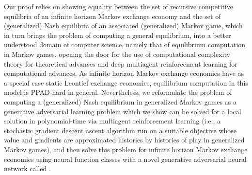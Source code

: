 Our proof relies on showing equality between the set of recursive competitive equilibria of an infinite horizon Markov exchange economy and the set of (generalized) Nash equilibria of an associated (generalized) Markov game, which in turn brings the problem of computing a general equilibrium, into a better understood domain of computer science, namely that of equilibrium computation in Markov games, opening the door for the use of computational complexity theory for theoretical advances and deep multiagent reinforcement learning for computational advances. 
As infinite horizon Markov exchange economies have as a special case static Leontief exchange economies, equilibrium computation in this model is PPAD-hard in general. 
Nevertheless, we reformulate the problem of computing a (generalized) Nash equilibrium in generalized Markov games as a generative adversarial learning problem which we show can be solved for a local solution in polynomial-time via multiagent reinforcement learning (i.e., a stochastic gradient descent ascent algorithm run on a suitable objective whose value and gradients are approximated histories by histories of play in generalized Markov games), and then solve this problem for infinite horizon Markov exchange economies using neural function classes with a novel generative adversarial neural network called .
\fi
